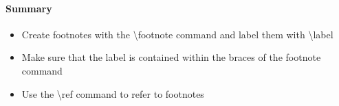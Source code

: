   \paragraph{Summary}
    \begin{itemize} %
      \item Create footnotes with the \textbackslash footnote command and label them with \textbackslash label
      \item Make sure that the label is contained within the braces of the footnote command
      \item Use the \textbackslash ref command to refer to footnotes
    \end{itemize} 

  \maketitle
  \newpage

